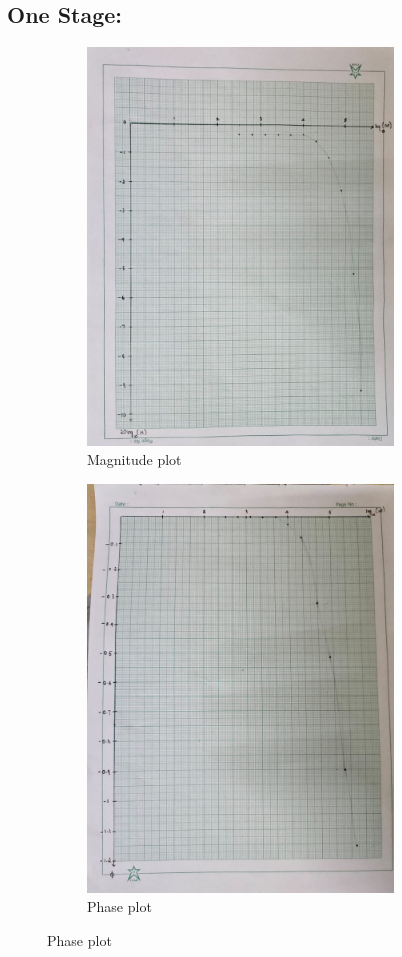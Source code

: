 \documentclass[a4paper,12pt]{article}
\begin{document}
\subsection{One Stage:}
\pagebreak
\begin{figure}[h!]
	\begin{subfigure}[b]{100pt}
		\caption{Magnitude plot}
		\includegraphics[width = 230pt]{figs/fig1.png}
	\end{subfigure}
	\hspace{110pt}
	\begin{subfigure}[b]{100pt}
		\caption{Phase plot}
		\includegraphics[width = 230pt]{figs/fig2.png}
	\end{subfigure}
\end{figure}
\end{document}
